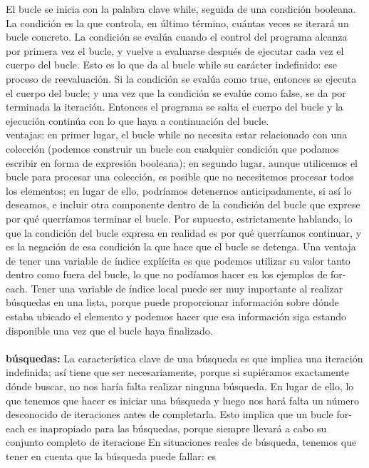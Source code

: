 \documentclass[11pt,a4paper]{article}
\begin{document}
	El bucle se inicia con la palabra clave while, seguida de una condición booleana. La condición es
	la que controla, en último término, cuántas veces se iterará un bucle concreto. La condición se evalúa
	cuando el control del programa alcanza por primera vez el bucle, y vuelve a evaluarse después
	de ejecutar cada vez el cuerpo del bucle. Esto es lo que da al bucle while su carácter indefinido:
	ese proceso de reevaluación. Si la condición se evalúa como true, entonces se ejecuta el cuerpo del
	bucle; y una vez que la condición se evalúe como false, se da por terminada la iteración. Entonces
	el programa se salta el cuerpo del bucle y la ejecución continúa con lo que haya a continuación
	del bucle. \\
	ventajas: en primer lugar, el bucle while no necesita estar relacionado con una colección
	(podemos construir un bucle con cualquier condición que podamos escribir en forma de expresión
	booleana); en segundo lugar, aunque utilicemos el bucle para procesar una colección, es posible
	que no necesitemos procesar todos los elementos; en lugar de ello, podríamos detenernos anticipadamente,
	si así lo deseamos, e incluir otra componente dentro de la condición del bucle que
	exprese por qué querríamos terminar el bucle. Por supuesto, estrictamente hablando, lo que la
	condición del bucle expresa en realidad es por qué querríamos continuar, y es la negación de
	esa condición la que hace que el bucle se detenga.
	Una ventaja de tener una variable de índice explícita es que podemos utilizar su valor tanto dentro
	como fuera del bucle, lo que no podíamos hacer en los ejemplos de for-each. Tener una variable de índice local puede ser muy importante al realizar búsquedas en una lista,
	porque puede proporcionar información sobre dónde estaba ubicado el elemento y podemos hacer
	que esa información siga estando disponible una vez que el bucle haya finalizado.
	\\
	\\
	\textbf{búsquedas:} La característica clave de una búsqueda es que implica una iteración indefinida; así tiene que ser
	necesariamente, porque si supiéramos exactamente dónde buscar, no nos haría falta realizar ninguna
	búsqueda. En lugar de ello, lo que tenemos que hacer es iniciar una búsqueda y luego nos
	hará falta un número desconocido de iteraciones antes de completarla. Esto implica que un bucle for-each es inapropiado para las búsquedas, porque siempre llevará a cabo su conjunto completo
	de iteracione En situaciones reales de búsqueda, tenemos que tener en cuenta que la búsqueda puede fallar: es
\end{document}
